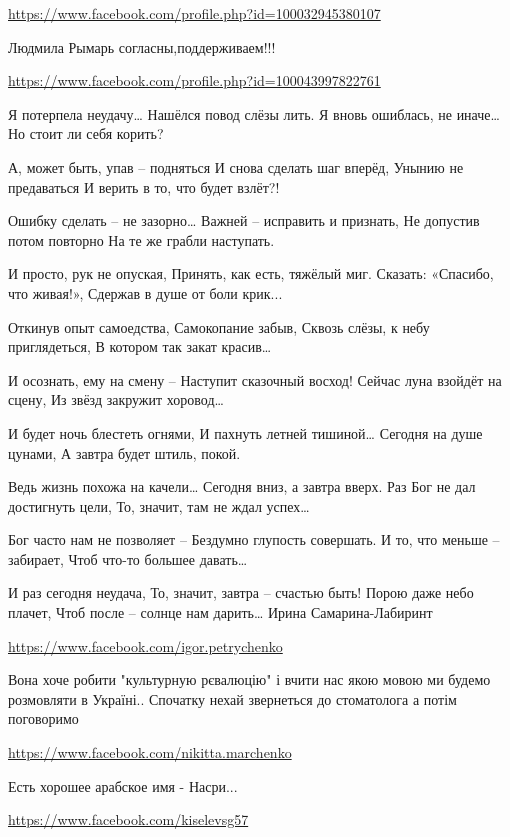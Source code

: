 \documentclass[a4paper,11pt]{extreport}
\begin{document}
\begin{itemize}
\begin{itemize}
\url{https://www.facebook.com/profile.php?id=100032945380107}

Людмила Рымарь согласны,поддерживаем!!!

\end{itemize}
\url{https://www.facebook.com/profile.php?id=100043997822761}

Я потерпела неудачу…
Нашёлся повод слёзы лить.
Я вновь ошиблась, не иначе…
Но стоит ли себя корить?

А, может быть, упав – подняться
И снова сделать шаг вперёд,
Унынию не предаваться
И верить в то, что будет взлёт?!

Ошибку сделать – не зазорно…
Важней – исправить и признать,
Не допустив потом повторно
На те же грабли наступать.

И просто, рук не опуская,
Принять, как есть, тяжёлый миг.
Сказать: «Спасибо, что живая!»,
Сдержав в душе от боли крик...

Откинув опыт самоедства,
Самокопание забыв,
Сквозь слёзы, к небу приглядеться,
В котором так закат красив…

И осознать, ему на смену –
Наступит сказочный восход!
Сейчас луна взойдёт на сцену,
Из звёзд закружит хоровод…

И будет ночь блестеть огнями,
И пахнуть летней тишиной…
Сегодня на душе цунами,
А завтра будет штиль, покой.

Ведь жизнь похожа на качели…
Сегодня вниз, а завтра вверх.
Раз Бог не дал достигнуть цели,
То, значит, там не ждал успех…

Бог часто нам не позволяет –
Бездумно глупость совершать.
И то, что меньше – забирает,
Чтоб что-то большее давать…

И раз сегодня неудача,
То, значит, завтра – счастью быть!
Порою даже небо плачет,
Чтоб после – солнце нам дарить…
Ирина Самарина-Лабиринт

\url{https://www.facebook.com/igor.petrychenko}

Вона хоче робити "культурную рєвалюцію" і вчити нас якою мовою ми будемо розмовляти в Україні..
Спочатку нехай звернеться до стоматолога а потім поговоримо

\url{https://www.facebook.com/nikitta.marchenko}

Есть хорошее арабское имя - Насри...

\url{https://www.facebook.com/kiselevsg57}


\end{itemize}
\end{document}
